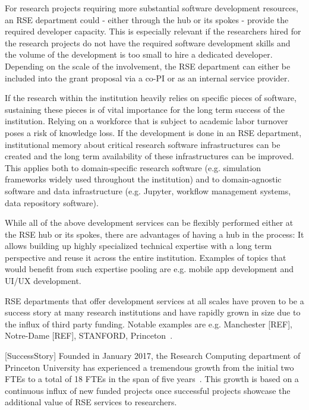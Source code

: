\documentclass[a4paper]{article}
\makeatletter
\newcommand*{\eg}{e.g.\@\xspace}
\makeatother
\begin{document}
For research projects requiring more substantial software development resources, an RSE department could - either through the hub or its spokes - provide the required developer capacity.
This is especially relevant if the researchers hired for the research projects do not have the required software development skills and the volume of the development is too small to hire a dedicated developer.
Depending on the scale of the involvement, the RSE department can either be included into the grant proposal via a co-PI or as an internal service provider.

If the research within the institution heavily relies on specific pieces of software,
sustaining these pieces is of vital importance for the long term success of the institution.
Relying on a workforce that is subject to academic labor turnover poses a risk of knowledge loss.
If the development is done in an RSE department, institutional memory about critical research software infrastructures can be created and the long term availability of these infrastructures can be improved.
This applies both to domain-specific research software (e.g. simulation frameworks widely used throughout the institution)
and to domain-agnostic software and data infrastructure (\eg Jupyter, workflow management systems, data repository software).

While all of the above development services can be flexibly performed either at the RSE hub or its spokes, there are advantages of having a hub in the process:
It allows building up highly specialized technical expertise with a long term perspective and reuse it across the entire institution.
Examples of topics that would benefit from such expertise pooling are \eg mobile app development and UI/UX development.

RSE departments that offer development services at all scales have proven to be a success story at many research institutions and have rapidly grown in size due to the influx of third party funding.
Notable examples are \eg Manchester [REF], Notre-Dame [REF], STANFORD, Princeton~\autocite{Cosden2022a}.

[SuccessStory]
Founded in January 2017, the Research Computing department of Princeton University has experienced a tremendous growth from the initial two FTEs to a total of 18 FTEs in the span of five years~\autocite{Cosden2022a}.
This growth is based on a continuous influx of new funded projects once successful projects showcase the additional value of RSE services to researchers.
\end{document}
